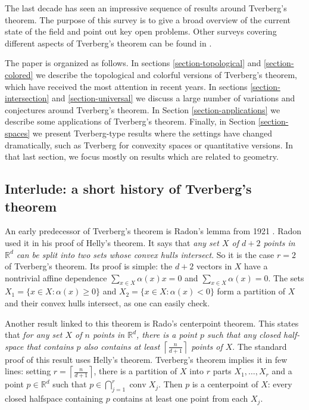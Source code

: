 \documentclass[11pt]{article}
\newcommand{\rr}{\mathbb{R}}
\newcommand{\al}{\alpha}
\DeclareMathOperator{\conv}{conv}
\begin{document}
	The last decade has seen an impressive sequence of results around Tverberg's theorem.  The purpose of this survey is to give a broad overview of  the current state of the field and point out key open problems.  Other surveys covering different aspects of Tverberg's theorem can be found in \cite{Eckhoff:1979bi, Eck93survey, Matousek:2002td, BBZ17survey, de2017discrete, BZ17}.
	
	The paper is organized as follows.  In sections \ref{section-topological} and \ref{section-colored} we describe the topological and colorful versions of Tverberg's theorem, which have received the most attention in recent years.  In sections \ref{section-intersection} and \ref{section-universal} we discuss a large number of variations and conjectures around Tverberg's theorem.  In Section \ref{section-applications} we describe some applications of Tverberg's theorem.  Finally, in Section \ref{section-spaces} we present Tverberg-type results where the settings have changed dramatically, such as Tverberg for convexity spaces or quantitative versions.  In that last section, we focus mostly on results which are related to geometry.
	
	\subsection{Interlude: a short history of Tverberg's theorem}
	An early predecessor of Tverberg's theorem is Radon's lemma from 1921 \cite{Radon:1921vh, Eckhoff:1979bi}. Radon used it in his proof of Helly's theorem. It says that \textit{any set $X$ of $d+2$ points in $\rr^d$ can be split into two sets whose convex hulls intersect}. So it is the case $r=2$ of Tverberg's theorem. Its proof is simple: the $d+2$ vectors in $X$ have a nontrivial affine dependence $\sum_{x \in X}\al(x)x=0$ and  $\sum_{x \in X}\al(x)=0$. The sets $X_1=\{x \in X: \al(x)\ge 0\}$ and $X_2=\{x \in X: \al(x) < 0\}$ form a partition of $X$ and their convex hulls intersect, as one can easily check.
	
	Another result linked to this theorem is Rado's centerpoint theorem.  This states that \textit{for any set $X$ of $n$ points in $\rr^d$, there is a point $p$ such that any closed half-space that contains $p$ also contains at least $\left\lceil \frac{n}{d+1}\right\rceil$ points of $X$}. The standard proof of this result uses Helly's theorem. Tverberg's theorem implies it in few lines: setting $r=\left\lceil \frac{n}{d+1}\right\rceil$, there is a partition of $X$ into $r$ parts $X_1,\ldots,X_r$ and a point $p\in \rr^d$ such that $p \in \bigcap_{j=1}^r \conv X_j$. Then $p$ is a centerpoint of $X$: every closed halfspace containing $p$ contains at least one point from each $X_j$.
	
\end{document}
